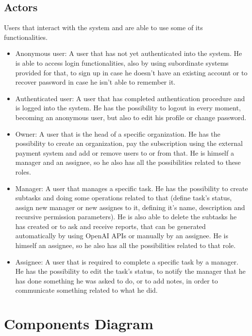 \documentclass{article}
\begin{document}
\subsection{Actors}
Users that interact with the system and are able to use some of its functionalities.
\begin{itemize}
    \item Anonymous user: A user that has not yet authenticated into the system. He is able to access login functionalities, also by using subordinate systems provided for that, to sign up in case he doesn't have an existing account or to recover password in case he isn't able to remember it.
    \item Authenticated user: A user that has completed authentication procedure and is logged into the system. He has the possibility to logout in every moment, becoming an anonymous user, but also to edit his profile or change password.
    \item Owner: A user that is the head of a specific organization. He has the possibility to create an organization, pay the subscription using the external payment system and add or remove users to or from that. He is himself a manager and an assignee, so he also has all the possibilities related to these roles.
    \item Manager: A user that manages a specific task. He has the possibility to create subtasks and doing some operations related to that (define task's status, assign new manager or new assignes to it, defining it's name, description and recursive permission parameters). He is also able to delete the subtasks he has created or to ask and receive reports, that can be generated automatically by using OpenAI APIs or manually by an assignee. He is himself an assignee, so he also has all the possibilities related to that role.
    \item Assignee: A user that is required to complete a specific task by a manager. He has the possibility to edit the task's status, to notify the manager that he has done something he was asked to do, or to add notes, in order to communicate something related to what he did.
\end{itemize}

\section{Components Diagram}
\end{document}
